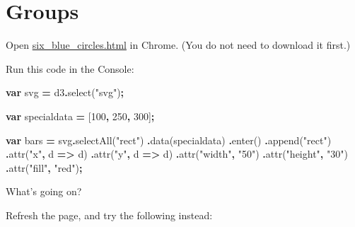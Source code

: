 \documentclass[
  openany]{book}
\newenvironment{Shaded}{\begin{snugshade}}{\end{snugshade}}
\newcommand{\DecValTok}[1]{\textcolor[rgb]{0.00,0.00,0.81}{#1}}
\newcommand{\FunctionTok}[1]{\textcolor[rgb]{0.00,0.00,0.00}{#1}}
\newcommand{\KeywordTok}[1]{\textcolor[rgb]{0.13,0.29,0.53}{\textbf{#1}}}
\newcommand{\NormalTok}[1]{#1}
\newcommand{\OperatorTok}[1]{\textcolor[rgb]{0.81,0.36,0.00}{\textbf{#1}}}
\newcommand{\StringTok}[1]{\textcolor[rgb]{0.31,0.60,0.02}{#1}}
\begin{document}
\hypertarget{groups}{%
\section{\texorpdfstring{Groups }{Groups }}\label{groups}}

Open \href{code/six_blue_circles.html}{six\_blue\_circles.html} in Chrome. (You do not need to download it first.)

Run this code in the Console:

\begin{Shaded}
\begin{Highlighting}[]
\KeywordTok{var}\NormalTok{ svg }\OperatorTok{=}\NormalTok{ d3}\OperatorTok{.}\FunctionTok{select}\NormalTok{(}\StringTok{"svg"}\NormalTok{)}\OperatorTok{;}

\KeywordTok{var}\NormalTok{ specialdata }\OperatorTok{=}\NormalTok{ [}\DecValTok{100}\OperatorTok{,} \DecValTok{250}\OperatorTok{,} \DecValTok{300}\NormalTok{]}\OperatorTok{;}

\KeywordTok{var}\NormalTok{ bars }\OperatorTok{=}\NormalTok{ svg}\OperatorTok{.}\FunctionTok{selectAll}\NormalTok{(}\StringTok{"rect"}\NormalTok{)}
      \OperatorTok{.}\FunctionTok{data}\NormalTok{(specialdata)}
      \OperatorTok{.}\FunctionTok{enter}\NormalTok{()}
      \OperatorTok{.}\FunctionTok{append}\NormalTok{(}\StringTok{"rect"}\NormalTok{)}
        \OperatorTok{.}\FunctionTok{attr}\NormalTok{(}\StringTok{"x"}\OperatorTok{,}\NormalTok{ d }\KeywordTok{=\textgreater{}}\NormalTok{ d)}
        \OperatorTok{.}\FunctionTok{attr}\NormalTok{(}\StringTok{"y"}\OperatorTok{,}\NormalTok{ d }\KeywordTok{=\textgreater{}}\NormalTok{ d)}
        \OperatorTok{.}\FunctionTok{attr}\NormalTok{(}\StringTok{"width"}\OperatorTok{,} \StringTok{"50"}\NormalTok{)}
        \OperatorTok{.}\FunctionTok{attr}\NormalTok{(}\StringTok{"height"}\OperatorTok{,} \StringTok{"30"}\NormalTok{)}
        \OperatorTok{.}\FunctionTok{attr}\NormalTok{(}\StringTok{"fill"}\OperatorTok{,} \StringTok{"red"}\NormalTok{)}\OperatorTok{;}
\end{Highlighting}
\end{Shaded}

What's going on?

Refresh the page, and try the following instead:
\end{document}
